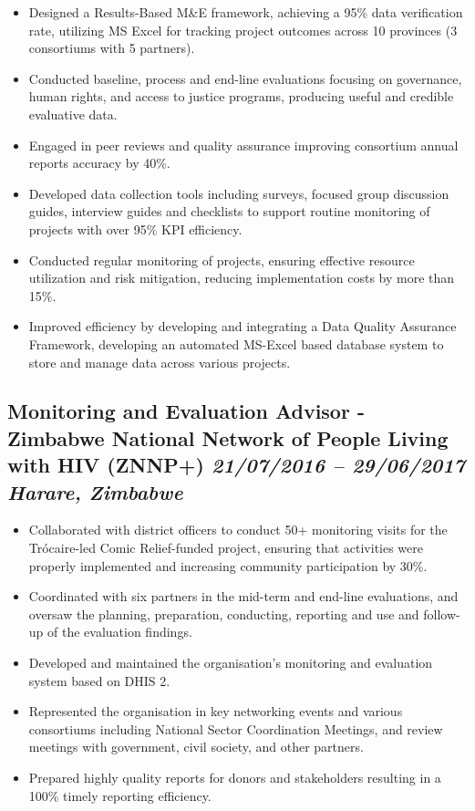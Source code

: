 \documentclass[
  10pt,
]{article}
\providecommand{\tightlist}{%
  \setlength{\itemsep}{0pt}\setlength{\parskip}{0pt}}
\begin{document}
\begin{itemize}
\tightlist
\item
  Designed a Results-Based M\&E framework, achieving a 95\% data
  verification rate, utilizing MS Excel for tracking project outcomes
  across 10 provinces (3 consortiums with 5 partners).
\item
  Conducted baseline, process and end-line evaluations focusing on
  governance, human rights, and access to justice programs, producing
  useful and credible evaluative data.
\item
  Engaged in peer reviews and quality assurance improving consortium
  annual reports accuracy by 40\%.
\item
  Developed data collection tools including surveys, focused group
  discussion guides, interview guides and checklists to support routine
  monitoring of projects with over 95\% KPI efficiency.
\item
  Conducted regular monitoring of projects, ensuring effective resource
  utilization and risk mitigation, reducing implementation costs by more
  than 15\%.
\item
  Improved efficiency by developing and integrating a Data Quality
  Assurance Framework, developing an automated MS-Excel based database
  system to store and manage data across various projects.
\end{itemize}

\subsection{\texorpdfstring{Monitoring and Evaluation Advisor - Zimbabwe
National Network of People Living with HIV (ZNNP+) \emph{21/07/2016 --
29/06/2017} \textbar{} \emph{Harare,
Zimbabwe}}{Monitoring and Evaluation Advisor - Zimbabwe National Network of People Living with HIV (ZNNP+) 21/07/2016 -- 29/06/2017 \textbar{} Harare, Zimbabwe}}\label{monitoring-and-evaluation-advisor---zimbabwe-national-network-of-people-living-with-hiv-znnp-21072016-29062017-harare-zimbabwe}

\begin{itemize}
\tightlist
\item
  Collaborated with district officers to conduct 50+ monitoring visits
  for the Trócaire-led Comic Relief-funded project, ensuring that
  activities were properly implemented and increasing community
  participation by 30\%.
\item
  Coordinated with six partners in the mid-term and end-line
  evaluations, and oversaw the planning, preparation, conducting,
  reporting and use and follow-up of the evaluation findings.
\item
  Developed and maintained the organisation's monitoring and evaluation
  system based on DHIS 2.
\item
  Represented the organisation in key networking events and various
  consortiums including National Sector Coordination Meetings, and
  review meetings with government, civil society, and other partners.
\item
  Prepared highly quality reports for donors and stakeholders resulting
  in a 100\% timely reporting efficiency.
\end{itemize}
\end{document}
